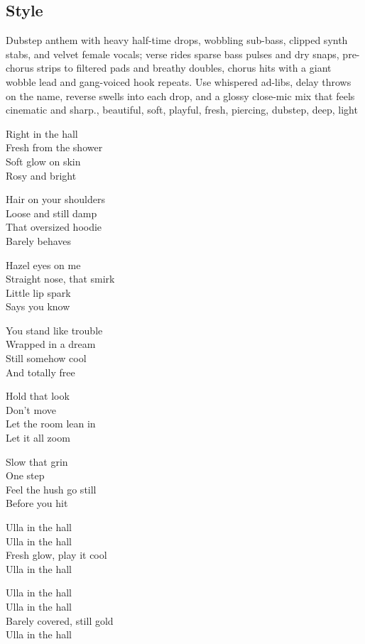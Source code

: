 \subsection{Style}
Dubstep anthem with heavy half-time drops, wobbling sub-bass, clipped synth stabs, and velvet female vocals; verse rides sparse bass pulses and dry snaps, pre-chorus strips to filtered pads and breathy doubles, chorus hits with a giant wobble lead and gang-voiced hook repeats. Use whispered ad-libs, delay throws on the name, reverse swells into each drop, and a glossy close-mic mix that feels cinematic and sharp., beautiful, soft, playful, fresh, piercing, dubstep, deep, light
\begin{lyrics}
Right in the hall\\
Fresh from the shower\\
Soft glow on skin\\
Rosy and bright

Hair on your shoulders\\
Loose and still damp\\
That oversized hoodie\\
Barely behaves

Hazel eyes on me\\
Straight nose, that smirk\\
Little lip spark\\
Says you know

You stand like trouble\\
Wrapped in a dream\\
Still somehow cool\\
And totally free

Hold that look\\
Don’t move\\
Let the room lean in\\
Let it all zoom

Slow that grin\\
One step\\
Feel the hush go still\\
Before you hit

Ulla in the hall\\
Ulla in the hall\\
Fresh glow, play it cool\\
Ulla in the hall

Ulla in the hall\\
Ulla in the hall\\
Barely covered, still gold\\
Ulla in the hall


\end{lyrics}
